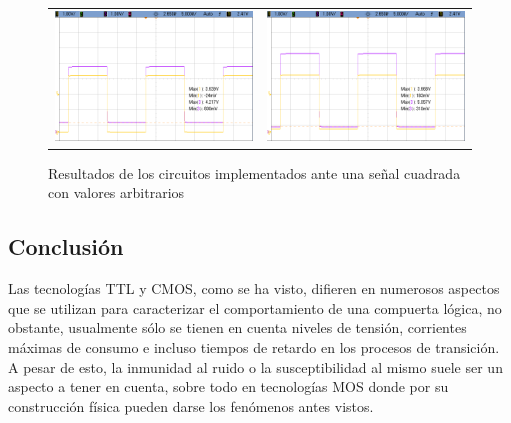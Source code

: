\begin{figure}[H]
    \centering
    \begin{tabular}{c c}
        \includegraphics[scale=0.2]{../EJ5/Mediciones/Osciloscopio/LEVEL_SHIFTER/cropped_bjt.png} &
        \includegraphics[scale=0.2]{../EJ5/Mediciones/Osciloscopio/LEVEL_SHIFTER/cropped_mos.png} 
    \end{tabular}
    \caption{Resultados de los circuitos implementados ante una se\~nal cuadrada con valores arbitrarios}
    \label{fig:resultados_interfaces}
\end{figure}

\subsection{Conclusi\'on}
Las tecnolog\'ias TTL y CMOS, como se ha visto, difieren en numerosos aspectos que se utilizan para caracterizar el comportamiento de una compuerta l\'ogica, no obstante, usualmente s\'olo se tienen en cuenta niveles de tensi\'on, corrientes m\'aximas de consumo e incluso tiempos de retardo en los procesos de transici\'on. A pesar de esto, la inmunidad al ruido o la susceptibilidad al mismo suele ser un aspecto a tener en cuenta, sobre todo en tecnolog\'ias MOS donde por su construcci\'on
f\'isica pueden darse los fen\'omenos antes vistos.


